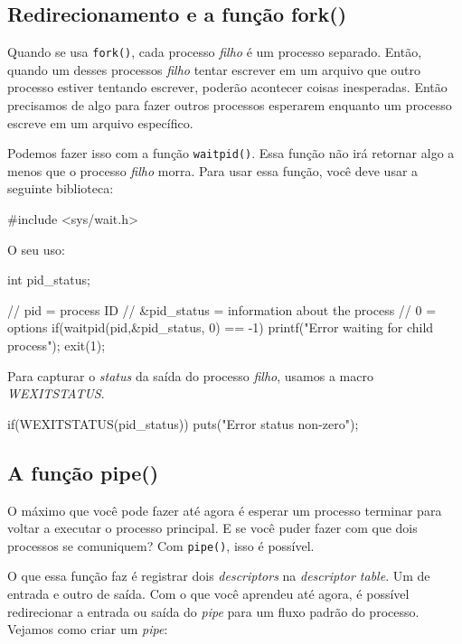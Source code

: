 \documentclass[12pt, a4paper]{article}
\begin{document}
\subsection{Redirecionamento e a função fork()}

Quando se usa \verb|fork()|, cada processo \textit{filho} é um processo separado. Então, quando um desses processos \textit{filho} tentar escrever em um arquivo que outro processo estiver tentando escrever, poderão acontecer coisas inesperadas. Então precisamos de algo para fazer outros processos esperarem enquanto um processo escreve em um arquivo específico.

Podemos fazer isso com a função \verb|waitpid()|. Essa função não irá retornar algo a menos que o processo \textit{filho} morra. Para usar essa função, você deve usar a seguinte biblioteca:\\

\begin{ccode}
#include <sys/wait.h>
\end{ccode}

O seu uso:\\

\begin{ccode}
int pid_status;

// pid = process ID
// &pid_status = information about the process
// 0 = options
if(waitpid(pid,&pid_status, 0) == -1){
	printf("Error waiting for child process\n");
	exit(1);
}
\end{ccode}

Para capturar o \textit{status} da saída do processo \textit{filho}, usamos a macro \textit{WEXITSTATUS}.\\

\begin{ccode}
if(WEXITSTATUS(pid_status))
	puts("Error status non-zero");
\end{ccode}

\subsection{A função pipe()}

O máximo que você pode fazer até agora é esperar um processo terminar para voltar a executar o processo principal. E se você puder fazer com que dois processos se comuniquem? Com \verb|pipe()|, isso é possível.

O que essa função faz é registrar dois \textit{descriptors} na \textit{descriptor table}. Um de entrada e outro de saída. Com o que você aprendeu até agora, é possível redirecionar a entrada ou saída do \textit{pipe} para um fluxo padrão do processo. Vejamos como criar um \textit{pipe}:\\
\end{document}
